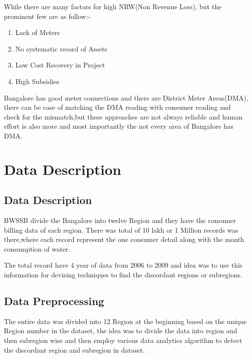 \documentclass[12pt]{iiscthes}
\begin{document}
      While there are many factors for high NRW(Non Revenue Loss), but the prominent few are as follow:-
    
     \begin{enumerate}
     	\item Lack of Meters
     	\item No systematic record of Assets
     	\item Low Cost Recovery in Project
     	\item High Subsidies
     \end{enumerate}
     
Bangalore has good meter connections and there are District Meter Areas(DMA),
there can be case of matching the DMA reading with consumer reading and check 
for the mismatch,but these approaches are not always reliable and human effort is also more and most importantly the not every area of Bangalore has DMA.
    

\chapter{Data Description}
\section{Data Description}
 BWSSB divide the Bangalore into twelve Region and they have the consumer billing data of each region.
 There was total of 10 lakh or 1 Million records was there,where each record represent the one consumer detail along with the month consumption of water.
 
 The total record have 4 year of data from 2006 to 2009 and idea was to use this
 information for devising techniques to find the discordant regions or subregions.
 
 \section{Data Preprocessing}
  The entire data was divided into 12 Region at the beginning based on the unique 
  Region number in the dataset, the idea was to divide the data into region and then subregion wise and then employ various data analytics algorithm to detect the discordant region and subregion in dataset.
  
\end{document}
